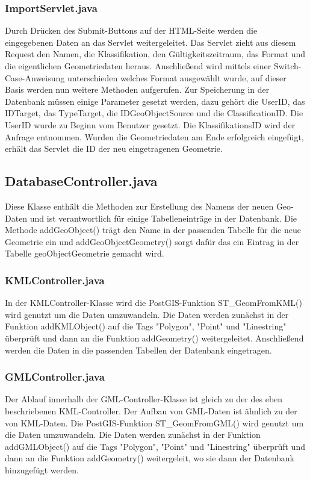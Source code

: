 \documentclass[]{article}
\begin{document}
\subsubsection{ImportServlet.java}
Durch Drücken des Submit-Buttons auf der HTML-Seite werden die eingegebenen Daten an das Servlet weitergeleitet. Das Servlet zieht aus diesem Request den Namen, die Klassifikation, den Gültigkeitszeitraum, das Format und die eigentlichen Geometriedaten heraus. Anschließend wird mittels einer Switch-Case-Anweisung unterschieden welches Format ausgewählt wurde, auf dieser Basis werden nun weitere Methoden aufgerufen. Zur Speicherung in der Datenbank müssen einige Parameter gesetzt werden, dazu gehört die UserID, das IDTarget, das TypeTarget, die IDGeoObjectSource und die ClassificationID. Die UserID wurde zu Beginn vom Benutzer gesetzt. Die KlassifikationsID wird der Anfrage entnommen. Wurden die Geometriedaten am Ende erfolgreich eingefügt, erhält das Servlet die ID der neu eingetragenen Geometrie.

\subsection{DatabaseController.java}
Diese Klasse enthält die Methoden zur Erstellung des Namens der neuen Geo-Daten und ist verantwortlich für einige Tabelleneinträge in der Datenbank. Die Methode addGeoObject() trägt den Name in der passenden Tabelle für die neue Geometrie ein und addGeoObjectGeometry() sorgt dafür das ein Eintrag in der Tabelle geoObjectGeometrie gemacht wird.

\subsubsection{KMLController.java}
In der KMLController-Klasse wird die PostGIS-Funktion ST\_GeomFromKML() wird genutzt um die Daten umzuwandeln. Die Daten werden zunächst in der Funktion addKMLObject() auf die Tags "Polygon", "Point" und "Linestring" überprüft und dann an die Funktion addGeometry() weitergeleitet. Anschließend werden die Daten in die passenden Tabellen der Datenbank eingetragen.

\subsubsection{GMLController.java}
Der Ablauf innerhalb der GML-Controller-Klasse ist gleich zu der des eben beschriebenen KML-Controller. Der Aufbau von GML-Daten ist ähnlich zu der von KML-Daten. Die PostGIS-Funktion ST\_GeomFromGML() wird genutzt um die Daten umzuwandeln. Die Daten werden zunächst in der Funktion addGMLObject() auf die Tags "Polygon", "Point" und "Linestring" überprüft und dann an die Funktion addGeometry() weitergeleit, wo sie dann der Datenbank hinzugefügt werden.
\end{document}
